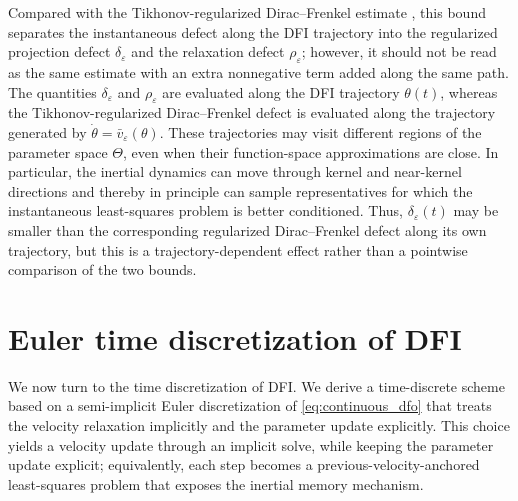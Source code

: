 \documentclass[oneside,11pt]{article}
\theoremstyle{remark}
\theoremstyle{thmstyleone}
\theoremstyle{thmstylethree}
\theoremstyle{thmstyletwo}
\begin{document}
          Compared with the Tikhonov-regularized Dirac--Frenkel estimate \cite[Section~3.1]{Feischl2024}, this bound separates the instantaneous defect along the DFI trajectory into the regularized projection defect $\delta_\varepsilon$ and the relaxation defect $\rho_\varepsilon$;  however, it should not be read as the same estimate with an extra nonnegative term added along the same path.
          The quantities $\delta_\varepsilon$ and $\rho_\varepsilon$ are evaluated along the DFI trajectory $\theta(t)$, whereas the Tikhonov-regularized Dirac--Frenkel defect is evaluated along the trajectory generated by $\dot\theta=\bar v_\varepsilon(\theta)$.
          These trajectories may visit different regions of the parameter space $\Theta$, even when their function-space approximations are close.
          In particular, the inertial dynamics can move through kernel and near-kernel directions  and thereby in principle can sample representatives for which the instantaneous least-squares problem is better conditioned.
          Thus, $\delta_\varepsilon(t)$ may be smaller than the corresponding regularized Dirac--Frenkel defect along its own trajectory, but this is a trajectory-dependent effect rather than a pointwise comparison of the two bounds.

\section{Euler time discretization of DFI}
\label{sec:euler-dfi}
We now turn to the time discretization of DFI. We derive a time-discrete scheme based on a semi-implicit Euler discretization of \eqref{eq:continuous_dfo} that treats the velocity relaxation implicitly and the parameter update explicitly.
This choice yields a velocity update through an implicit solve, while keeping the parameter update explicit; equivalently, each step becomes a previous-velocity-anchored least-squares problem that exposes the inertial memory mechanism.
\end{document}
